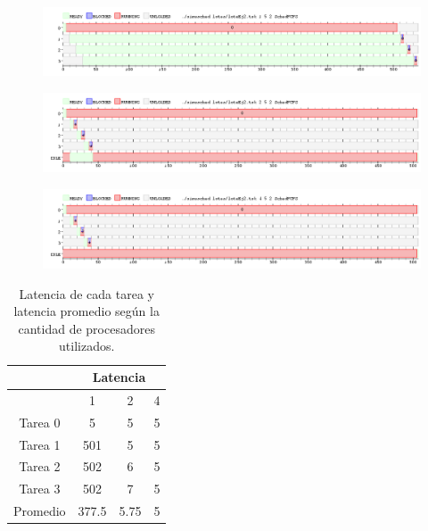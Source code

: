 
\begin{figure}[H]
  \centering
  \includegraphics[width=1\textwidth]{img/imgEj2-1}
  \caption{}
  \label{fig:ej2-1}
\end{figure}

\begin{figure}[H]
  \centering
  \includegraphics[width=1\textwidth]{img/imgEj2-2}
  \caption{}
  \label{fig:ej2-2}
\end{figure}

\begin{figure}[H]
  \centering
  \includegraphics[width=1\textwidth]{img/imgEj2-3}
  \caption{}
  \label{fig:ej2-3}
\end{figure}

\begin{table}[H]
  \center
  \begin{center}
  \begin{tabular}{c|c|c|c|}
    \cline{2-4}
    & \multicolumn{3}{|c|}{\cellcolor{LightCyan}Latencia} \\
    \hline
    \rowcolor{LightCyan}
    \multicolumn{1}{|c|}{\#Procesadores} & 1 & 2 & 4 \\
    \hline
    \multicolumn{1}{|c|}{\cellcolor{LightCyan}Tarea 0} & 5 & 5 & 5 \\
    \multicolumn{1}{|c|}{\cellcolor{LightCyan}Tarea 1} & 501 & 5 & 5 \\
    \multicolumn{1}{|c|}{\cellcolor{LightCyan}Tarea 2} & 502 & 6 & 5 \\
    \multicolumn{1}{|c|}{\cellcolor{LightCyan}Tarea 3} & 502 & 7 & 5 \\
    \hline
    \multicolumn{1}{|c|}{\cellcolor{LightCyan}Promedio} & 377.5 & 5.75 & 5 \\
    \hline
  \end{tabular}
  \end{center}
  \caption{\footnotesize Latencia de cada tarea y latencia promedio según la cantidad de procesadores utilizados.}
  \label{tab:ej2}
\end{table}

